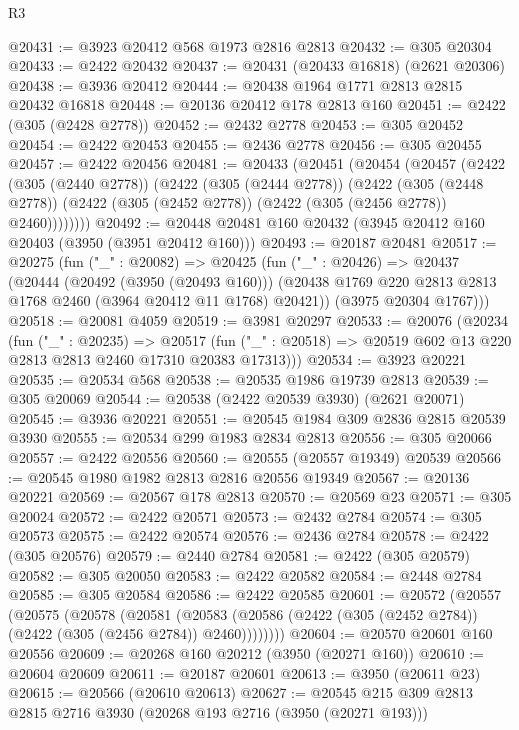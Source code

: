 \begin{lexlean}{R3}
\begin{coremodule}
@20431 := @3923 @20412 @568 @1973 @2816 @2813
@20432 := @305 @20304
@20433 := @2422 @20432
@20437 := @20431 (@20433 @16818) (@2621 @20306)
@20438 := @3936 @20412
@20444 := @20438 @1964 @1771 @2813 @2815 @20432 @16818
@20448 := @20136 @20412 @178 @2813 @160
@20451 := @2422 (@305 (@2428 @2778))
@20452 := @2432 @2778
@20453 := @305 @20452
@20454 := @2422 @20453
@20455 := @2436 @2778
@20456 := @305 @20455
@20457 := @2422 @20456
@20481 := @20433
    (@20451
      (@20454
        (@20457
          (@2422
            (@305 (@2440 @2778))
            (@2422
              (@305 (@2444 @2778))
              (@2422
                (@305 (@2448 @2778))
                (@2422 (@305 (@2452 @2778)) (@2422 (@305 (@2456 @2778)) @2460))))))))
@20492 := @20448 @20481 @160 @20432 (@3945 @20412 @160 @20403 (@3950 (@3951 @20412 @160)))
@20493 := @20187 @20481
@20517 := @20275
    (fun ("_" : @20082) =>
    @20425
      (fun ("_" : @20426) =>
      @20437
        (@20444
          (@20492 (@3950 (@20493 @160)))
          (@20438 @1769 @220 @2813 @2813 @1768 @2460 (@3964 @20412 @11 @1768) @20421))
        (@3975 @20304 @1767)))
@20518 := @20081 @4059
@20519 := @3981 @20297
@20533 := @20076
    (@20234
      (fun ("_" : @20235) =>
      @20517 (fun ("_" : @20518) => @20519 @602 @13 @220 @2813 @2813 @2460 @17310 @20383 @17313)))
@20534 := @3923 @20221
@20535 := @20534 @568
@20538 := @20535 @1986 @19739 @2813
@20539 := @305 @20069
@20544 := @20538 (@2422 @20539 @3930) (@2621 @20071)
@20545 := @3936 @20221
@20551 := @20545 @1984 @309 @2836 @2815 @20539 @3930
@20555 := @20534 @299 @1983 @2834 @2813
@20556 := @305 @20066
@20557 := @2422 @20556
@20560 := @20555 (@20557 @19349) @20539
@20566 := @20545 @1980 @1982 @2813 @2816 @20556 @19349
@20567 := @20136 @20221
@20569 := @20567 @178 @2813
@20570 := @20569 @23
@20571 := @305 @20024
@20572 := @2422 @20571
@20573 := @2432 @2784
@20574 := @305 @20573
@20575 := @2422 @20574
@20576 := @2436 @2784
@20578 := @2422 (@305 @20576)
@20579 := @2440 @2784
@20581 := @2422 (@305 @20579)
@20582 := @305 @20050
@20583 := @2422 @20582
@20584 := @2448 @2784
@20585 := @305 @20584
@20586 := @2422 @20585
@20601 := @20572
    (@20557
      (@20575
        (@20578
          (@20581
            (@20583 (@20586 (@2422 (@305 (@2452 @2784)) (@2422 (@305 (@2456 @2784)) @2460))))))))
@20604 := @20570 @20601 @160 @20556
@20609 := @20268 @160 @20212 (@3950 (@20271 @160))
@20610 := @20604 @20609
@20611 := @20187 @20601
@20613 := @3950 (@20611 @23)
@20615 := @20566 (@20610 @20613)
@20627 := @20545 @215 @309 @2813 @2815 @2716 @3930 (@20268 @193 @2716 (@3950 (@20271 @193)))

\end{coremodule}
\end{lexlean}

